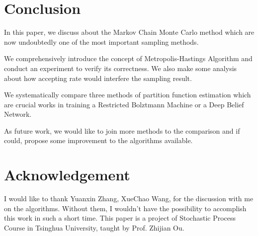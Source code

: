 \documentclass{sig-alternate-05-2015}
\begin{document}
\section{Conclusion} \label{sec:conclusion}
In this paper, we discuss about the Markov Chain Monte Carlo method which are now undoubtedly one of the most important sampling methods.

We comprehensively introduce the concept of Metropolis-Hastings Algorithm and conduct an experiment to verify its correctness. We also make some analysis about how accepting rate would interfere the sampling result.

We systematically compare three methods of partition function estimation which are crucial works in training a Restricted Bolztmann Machine or a Deep Belief Network. 

As future work, we would like to join more methods to the comparison and if could, propose some improvement to the algorithms available.



\renewcommand{\baselinestretch}{1.1}
\balance
\small
\section{Acknowledgement} \label{sec:acknowledgement}
I would like to thank Yuanxin Zhang, XueChao Wang, for the discussion with me on the algorithms. Without them, I wouldn't have the possibility to accomplish this work in such a short time. This paper is a project of Stochastic Process Course in Tsinghua University, taught by Prof. Zhijian Ou.




	
\end{document}
